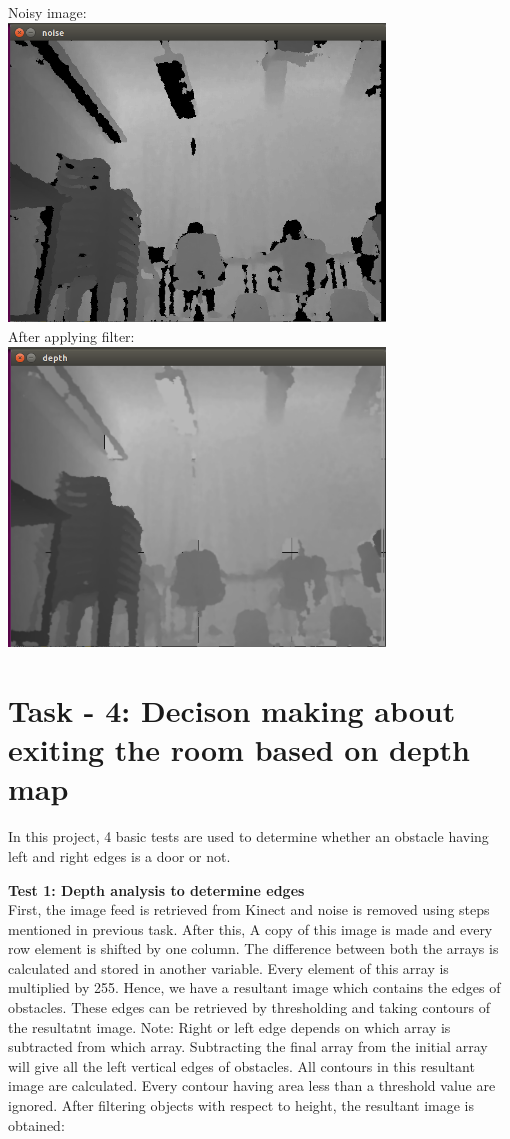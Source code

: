 \documentclass{report}
\begin{document}
Noisy image: \\ 
\includegraphics[width = 10cm]{Noise.png} \\
After applying filter: \\
\includegraphics[width = 10cm]{Noiseless.png} \\

\section{Task - 4: Decison making about exiting the room based on depth map}

In this project, 4 basic tests are used to determine whether an obstacle having left and right edges is a door or not.

\textbf{Test 1: Depth analysis to determine edges} \\

First, the image feed is retrieved from Kinect and noise is removed using steps mentioned in previous task. After this,
 A copy of this image is made and every row element is shifted by one column. The difference between both the arrays is calculated and stored in another variable. 
 Every element of this array is multiplied by 255. Hence, we have a resultant image which contains 
 the edges of obstacles. These edges can be retrieved by thresholding and taking contours of the 
 resultatnt image. Note: Right or left edge depends on which array is subtracted from which array. 
 Subtracting the final array from the initial array will give all the left vertical edges of obstacles. 
 All contours in this resultant image are calculated. Every contour having area less than a threshold value are ignored. After filtering objects with respect to 
 height, the resultant image is obtained: \\
\end{document}
